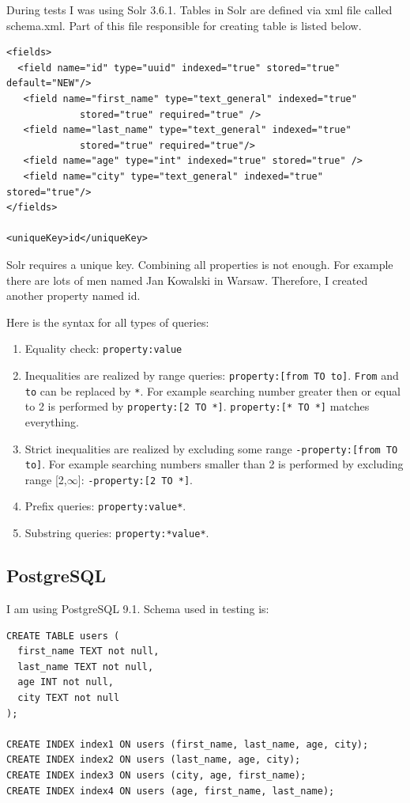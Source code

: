 \documentclass[10pt,a4paper]{article}
\begin{document}
During tests I was using Solr 3.6.1. Tables in Solr are defined via xml file called schema.xml. Part of this file responsible for creating table is listed below.

\begin{verbatim}
<fields>
  <field name="id" type="uuid" indexed="true" stored="true" default="NEW"/>
   <field name="first_name" type="text_general" indexed="true"
             stored="true" required="true" /> 
   <field name="last_name" type="text_general" indexed="true" 
             stored="true" required="true"/>
   <field name="age" type="int" indexed="true" stored="true" /> 
   <field name="city" type="text_general" indexed="true" stored="true"/>
</fields>

<uniqueKey>id</uniqueKey> 
\end{verbatim}

Solr requires a unique key. Combining all properties is not enough. For example there are lots of men named Jan Kowalski in Warsaw. Therefore, I created another property named id.

\bigskip
Here is the syntax for all types of queries:
\begin{enumerate}
\item Equality check: \verb|property:value|
\item Inequalities are realized by range queries: \verb|property:[from TO to]|. \verb|From| and \verb|to| can be replaced by \verb|*|. For example searching number greater then or equal to 2 is performed by \verb|property:[2 TO *]|. \verb|property:[* TO *]| matches everything.
\item Strict inequalities are realized by excluding some range \verb|-property:[from TO to]|. For example searching numbers smaller than 2 is performed by excluding range [2,$\infty$]: \verb|-property:[2 TO *]|.
\item Prefix queries: \verb|property:value*|.
\item Substring queries: \verb|property:*value*|.
 
\end{enumerate}

\subsection{PostgreSQL}

I am using PostgreSQL 9.1. Schema used in testing is:

\begin{verbatim}
CREATE TABLE users (
  first_name TEXT not null,
  last_name TEXT not null,
  age INT not null,
  city TEXT not null
);

CREATE INDEX index1 ON users (first_name, last_name, age, city);
CREATE INDEX index2 ON users (last_name, age, city);
CREATE INDEX index3 ON users (city, age, first_name);
CREATE INDEX index4 ON users (age, first_name, last_name);
\end{verbatim}
\end{document}
